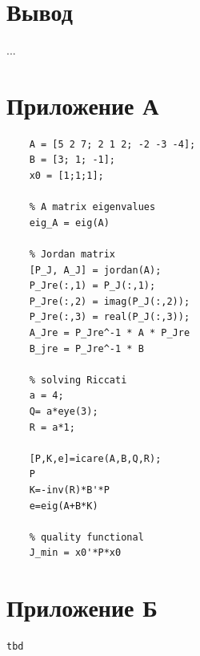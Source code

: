 \documentclass[a4paper, 12pt]{article}
\begin{document}
    \section{Вывод}
    ...


    \section{Приложение А}
    \begin{lstlisting}[label=task1, caption={Программа для задания 1}]
    % plant parameters
    A = [5 2 7; 2 1 2; -2 -3 -4];
    B = [3; 1; -1];
    x0 = [1;1;1];

    % A matrix eigenvalues
    eig_A = eig(A)

    % Jordan matrix
    [P_J, A_J] = jordan(A);
    P_Jre(:,1) = P_J(:,1);
    P_Jre(:,2) = imag(P_J(:,2));
    P_Jre(:,3) = real(P_J(:,3));
    A_Jre = P_Jre^-1 * A * P_Jre
    B_jre = P_Jre^-1 * B

    % solving Riccati
    a = 4;
    Q= a*eye(3);
    R = a*1;

    [P,K,e]=icare(A,B,Q,R);
    P
    K=-inv(R)*B'*P
    e=eig(A+B*K)

    % quality functional
    J_min = x0'*P*x0
    \end{lstlisting}


    \section{Приложение Б}
    \begin{lstlisting}[label=task2, caption={Программа для задания 2}]
        tbd
    \end{lstlisting}
\end{document}
